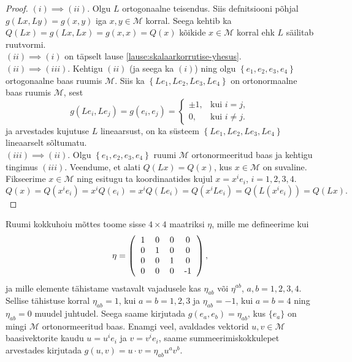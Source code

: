 \documentclass[a4paper,12pt]{article}
\numberwithin{equation}{section}
\begin{document}
\begin{proof}
$(i) \implies (ii)$. Olgu $L$ ortogonaalne teisendus. Siis defnitsiooni põhjal $g\left(Lx, Ly\right) = g\left(x, y\right)$ iga $x, y \in \mathcal{M}$ korral. Seega kehtib ka $Q\left(Lx\right) = g\left(Lx, Lx\right) = g\left(x, x\right) = Q\left(x\right)$ kõikide $x \in \mathcal{M}$ korral ehk $L$ säilitab ruutvormi. \\
$(ii) \implies (i)$ on täpselt lause \ref{lause:skalaarkorrutise-yhesus}. \\
$(ii) \implies (iii)$. Kehtigu $(ii)$ (ja seega ka $(i)$) ning olgu $\left\lbrace e_1, e_2, e_3, e_4 \right\rbrace$ ortogonaalne baas ruumis $\mathcal{M}$. Siis ka $\left\lbrace Le_1, Le_2, Le_3, Le_4 \right\rbrace$ on ortonormaalne baas ruumis $\mathcal{M}$, sest
\begin{equation*}
g \left(Le_i, Le_j\right) = g\left(e_i, e_j\right) = \begin{cases}
    \pm 1, & \text{kui $i = j$},\\
    0, & \text{kui $i \neq j$}.
  \end{cases}
\end{equation*}
ja arvestades kujutuse $L$ lineaarsust, on ka süsteem $\left\lbrace Le_1, Le_2, Le_3, Le_4 \right\rbrace$ lineaarselt sõltumatu. \\
$(iii) \implies (ii)$. Olgu $\left\lbrace e_1, e_2, e_3, e_4 \right\rbrace$ ruumi $\mathcal{M}$ ortonormeeritud baas ja kehtigu tingimus $(iii)$. Veendume, et alati $Q\left(Lx\right) = Q\left(x\right)$, kus $x \in \mathcal{M}$ on suvaline. Fikseerime $x \in \mathcal{M}$ ning esitugu ta koordinaatides kujul $x = x^i e_i$, $i = 1, 2, 3, 4$.
\begin{equation*}
Q\left(x\right) = Q\left(x^i e_i\right) = x^i Q\left(e_i\right) = x^i Q\left(Le_i\right) = Q\left(x^i L e_i\right) = Q\left(L\left(x^i e_i\right)\right) = Q\left(Lx\right).
\end{equation*}
\end{proof}

Ruumi kokkuhoiu mõttes toome sisse $4 \times 4$ maatriksi $\eta$, mille me defineerime kui
\begin{equation*}
\eta = \left( \begin{tabular}{cccc} 
1 & 0 & 0 & 0 \\ 
0 & 1 & 0 & 0 \\  
0 & 0 & 1 & 0 \\ 
0 & 0 & 0 & -1 \\ 
\end{tabular} \right),
\end{equation*}
ja mille elemente tähistame vastavalt vajadusele kas $\eta_{ab}$ või $\eta^{ab}$, $a, b = 1, 2, 3, 4$. Sellise tähistuse korral $\eta_{ab} = 1$, kui $a = b = 1, 2, 3$ ja $\eta_{ab} = -1$, kui $a = b = 4$ ning $\eta_{ab} = 0$ muudel juhtudel. Seega saame kirjutada $g\left(e_a, e_b\right) = \eta_{ab}$, kus $\{e_a\}$ on mingi $\mathcal{M}$ ortonormeeritud baas. Enamgi veel, avaldades vektorid $u, v \in \mathcal{M}$ baasivektorite kaudu $u = u^i e_i$ ja $v = v^i e_i$, saame summeerimiskokkulepet arvestades kirjutada $g \left(u, v\right) = u \cdot v = \eta_{ab} u^a v^b$.
\end{document}
